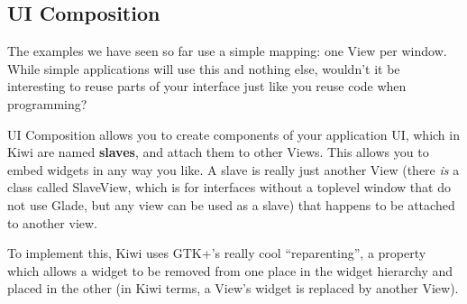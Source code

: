 \documentclass[a4paper]{howto}
\begin{document}





\subsection{UI Composition}

The examples we have seen so far use a simple mapping: one View per
window. While simple applications will use this and nothing else,
wouldn't it be interesting to reuse parts of your interface just like
you reuse code when programming?

UI Composition allows you to create components of your application UI,
which in Kiwi are named {\bf slaves}, and attach them to other Views.
This allows you to embed widgets in any way you like. A slave is really
just another View (there {\it is} a class called SlaveView, which is for
interfaces without a toplevel window that do not use Glade, but any view
can be used as a slave) that happens to be attached to another view.

To implement this, Kiwi uses GTK+'s really cool ``reparenting'', a
property which allows a widget to be removed from one place in the
widget hierarchy and placed in the other (in Kiwi terms, a View's widget
is replaced by another View).
\end{document}
